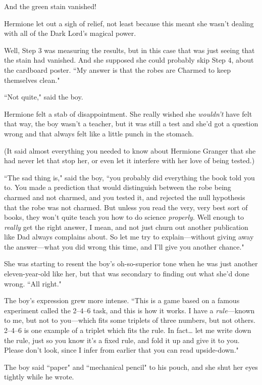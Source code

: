 And the green stain vanished!

Hermione let out a sigh of relief, not least because this meant she wasn't dealing with all of the Dark Lord's magical power.

Well, Step 3 was measuring the results, but in this case that was just seeing that the stain had vanished. And she supposed she could probably skip Step 4, about the cardboard poster. ``My answer is that the robes are Charmed to keep themselves clean."

``Not quite," said the boy.

Hermione felt a stab of disappointment. She really wished she \emph{wouldn't} have felt that way, the boy wasn't a teacher, but it was still a test and she'd got a question wrong and that always felt like a little punch in the stomach.

(It said almost everything you needed to know about Hermione Granger that she had never let that stop her, or even let it interfere with her love of being tested.)

``The sad thing is," said the boy, ``you probably did everything the book told you to. You made a prediction that would distinguish between the robe being charmed and not charmed, and you tested it, and rejected the null hypothesis that the robe was not charmed. But unless you read the very, very best sort of books, they won't quite teach you how to do science \emph{properly}. Well enough to \emph{really} get the right answer, I mean, and not just churn out another publication like Dad always complains about. So let me try to explain—without giving away the answer—what you did wrong this time, and I'll give you another chance."

She was starting to resent the boy's oh-so-superior tone when he was just another eleven-year-old like her, but that was secondary to finding out what she'd done wrong. ``All right."

The boy's expression grew more intense. ``This is a game based on a famous experiment called the 2--4--6 task, and this is how it works. I have a \emph{rule}—known to me, but not to you—which fits some triplets of three numbers, but not others. 2--4--6 is one example of a triplet which fits the rule. In fact{\ldots} let me write down the rule, just so you know it's a fixed rule, and fold it up and give it to you. Please don't look, since I infer from earlier that you can read upside-down."

The boy said ``paper" and ``mechanical pencil" to his pouch, and she shut her eyes tightly while he wrote.

